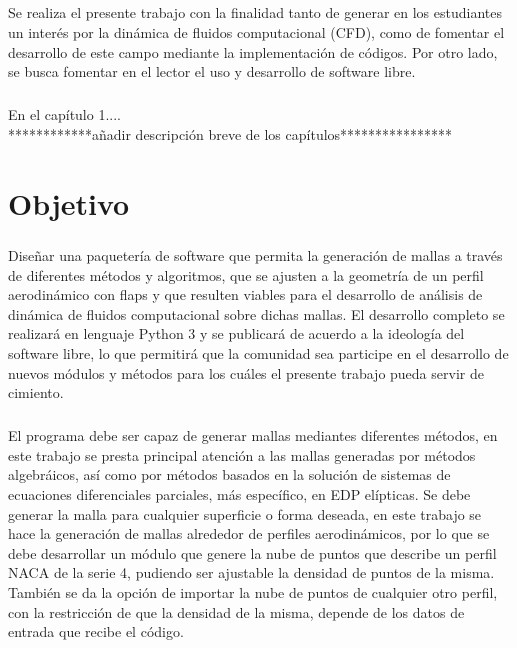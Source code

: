 \documentclass[letterpaper, openright, 12pt]{book}
\begin{document}
	\paragraph*{}
	Se realiza el presente trabajo con la finalidad tanto de generar en los
    estudiantes un interés por la dinámica de fluidos computacional (CFD), como
    de fomentar el desarrollo de este campo mediante la implementación de
    códigos. Por otro lado, se busca fomentar en el lector el uso y desarrollo
    de software libre.

	\paragraph*{}
	En el capítulo 1....\\************añadir descripción breve de los capítulos****************




	\chapter*{Objetivo}

    \paragraph*{}
    Diseñar una paquetería de software que permita la generación de mallas a
    través de diferentes métodos y algoritmos, que se ajusten a la geometría de
    un perfil aerodinámico con flaps y que resulten viables para el desarrollo
    de análisis  de dinámica de fluidos computacional sobre dichas mallas.
    El desarrollo completo se realizará en lenguaje Python 3 y se publicará de
    acuerdo a la ideología del software libre, lo que permitirá que la comunidad
    sea participe en el desarrollo de nuevos módulos y métodos para los cuáles
    el presente trabajo pueda servir de cimiento.

    \paragraph*{}
    El programa debe ser capaz de generar  mallas mediantes diferentes
    métodos, en este trabajo se presta principal atención a las mallas
    generadas por métodos algebráicos, así como por métodos basados en la
    solución de sistemas de ecuaciones diferenciales parciales,
    más específico, en EDP elípticas. Se debe generar la malla para
    cualquier superficie o forma deseada, en este trabajo se hace la
    generación de mallas alrededor de perfiles aerodinámicos, por lo que se
    debe desarrollar un módulo que genere la nube de puntos que describe un
    perfil NACA de la serie 4, pudiendo ser ajustable la densidad de puntos
    de la misma. También se da la opción de importar la nube de puntos de
    cualquier otro perfil, con la restricción de que la densidad de la
    misma, depende de los datos de entrada que recibe el código.
\end{document}
